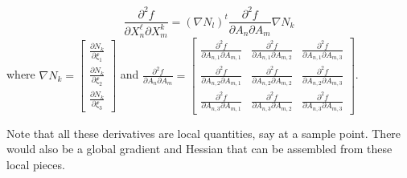 \documentclass{report}
\begin{document}
\begin{equation} \label{eqn:vol-hess-mat}
\frac{\partial^2 f}{\partial X_n^\ell \partial X_m^k} =
(\nabla N_l)^t \frac{\partial^2 f}{\partial A_n \partial A_m} \nabla N_k
\end{equation}
where $\nabla N_k = \left[\begin{array}{c} 
\frac{\partial N_k}{\partial \xi_1} \\
\frac{\partial N_k}{\partial \xi_2} \\
\frac{\partial N_k}{\partial \xi_3} \end{array}\right]$ 
and $\frac{\partial^2 f}{\partial A_n \partial A_m} = \left[\begin{array}{ccc}
\frac{\partial^2 f}{\partial A_{n,1} \partial A_{m,1}} &
\frac{\partial^2 f}{\partial A_{n,1} \partial A_{m,2}} &
\frac{\partial^2 f}{\partial A_{n,1} \partial A_{m,3}} \\
\frac{\partial^2 f}{\partial A_{n,2} \partial A_{m,1}} &
\frac{\partial^2 f}{\partial A_{n,2} \partial A_{m,2}} &
\frac{\partial^2 f}{\partial A_{n,2} \partial A_{m,3}} \\
\frac{\partial^2 f}{\partial A_{n,3} \partial A_{m,1}} &
\frac{\partial^2 f}{\partial A_{n,3} \partial A_{m,2}} &
\frac{\partial^2 f}{\partial A_{n,3} \partial A_{m,3}} \end{array}\right]$.\newline


\noindent Note that all these derivatives are local quantities, say at a sample point.  There would also be a global gradient and Hessian that can be assembled from these local pieces. \newline
\end{document}
